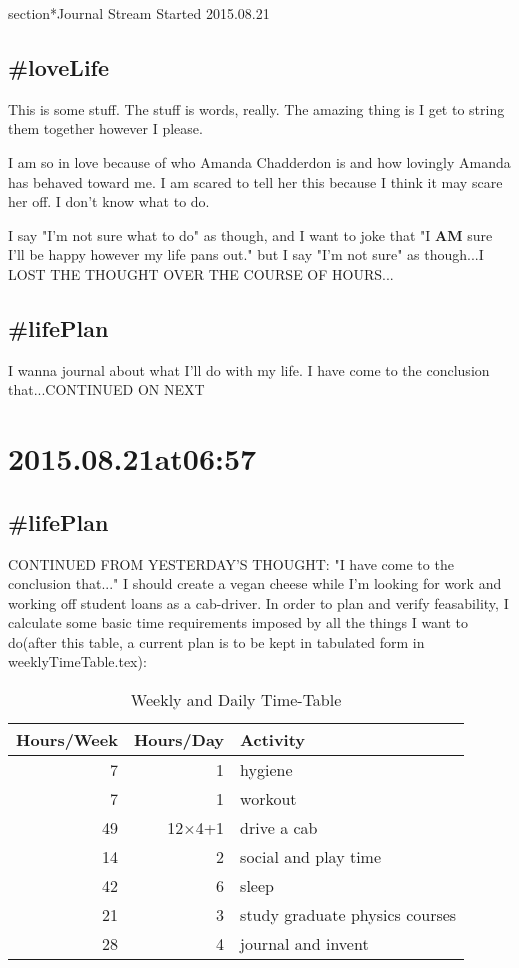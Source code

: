 section*{Journal Stream Started 2015.08.21}

\subsection*{\#loveLife}
This is some stuff. The stuff is words, really. The amazing thing is I get to string them together however I please.

I am so in love because of who Amanda Chadderdon is and how lovingly Amanda has behaved toward me. I am scared to tell her this because I think it may scare her off. I don't know what to do.

I say "I'm not sure what to do" as though, and I want to joke that "I \textbf{AM} sure I'll be happy however my life pans out." but I say "I'm not sure" as though...I LOST THE THOUGHT OVER THE COURSE OF HOURS...

\subsection*{\#lifePlan}
I wanna journal about what I'll do with my life. I have come to the conclusion that...CONTINUED ON NEXT

\section*{2015.08.21at06:57}
\subsection*{\#lifePlan} CONTINUED FROM YESTERDAY'S THOUGHT:
"I have come to the conclusion that..." I should create a vegan cheese while I'm looking for work and working off student loans as a cab-driver. In order to plan and verify feasability, I calculate some basic time requirements imposed by all the things I want to do(after this table, a current plan is to be kept in tabulated form in weeklyTimeTable.tex):

\begin{table}
\caption{\label{tab:originalWeeklyAndDailyTimeTable}Weekly and Daily Time-Table}
\begin{tabular}{|r|r|l|}
\hline
Hours/Week&Hours/Day&Activity\\
\hline
7&1&hygiene\\
7&1&workout\\
49&12$\times$4+1&drive a cab\\
14&2&social and play time\\
42&6&sleep\\
21&3&study graduate physics courses\\
28&4&journal and invent\\
\hline
\end{tabular}\end{table}

